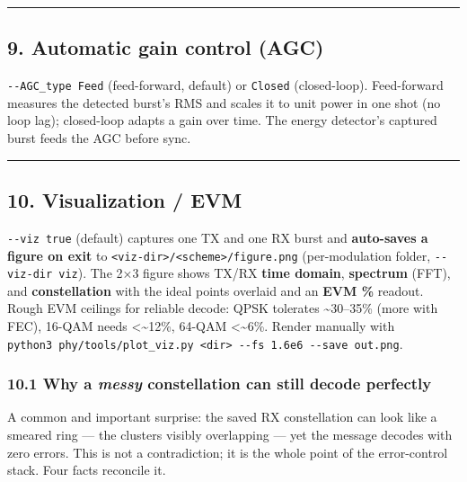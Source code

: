\documentclass[
  10pt,
]{article}
\begin{document}
\begin{center}\rule{0.5\linewidth}{0.5pt}\end{center}

\hypertarget{9-automatic-gain-control-agc}{%
\subsection{9. Automatic gain control
(AGC)}\label{9-automatic-gain-control-agc}}

\texttt{-\/-AGC\_type\ Feed} (feed-forward, default) or \texttt{Closed}
(closed-loop). Feed-forward measures the detected burst's RMS and scales
it to unit power in one shot (no loop lag); closed-loop adapts a gain
over time. The energy detector's captured burst feeds the AGC before
sync.

\begin{center}\rule{0.5\linewidth}{0.5pt}\end{center}

\hypertarget{10-visualization--evm}{%
\subsection{10. Visualization / EVM}\label{10-visualization--evm}}

\texttt{-\/-viz\ true} (default) captures one TX and one RX burst and
\textbf{auto-saves a figure on exit} to
\texttt{\textless{}viz-dir\textgreater{}/\textless{}scheme\textgreater{}/figure.png}
(per-modulation folder, \texttt{-\/-viz-dir\ viz}). The 2×3 figure shows
TX/RX \textbf{time domain}, \textbf{spectrum} (FFT), and
\textbf{constellation} with the ideal points overlaid and an \textbf{EVM
\%} readout. Rough EVM ceilings for reliable decode: QPSK tolerates
\textasciitilde30--35\% (more with FEC), 16-QAM needs
\textless\textasciitilde12\%, 64-QAM \textless\textasciitilde6\%. Render
manually with
\texttt{python3\ phy/tools/plot\_viz.py\ \textless{}dir\textgreater{}\ -\/-fs\ 1.6e6\ -\/-save\ out.png}.

\hypertarget{101-why-a-messy-constellation-can-still-decode-perfectly}{%
\subsubsection{\texorpdfstring{10.1 Why a \emph{messy} constellation can
still decode
perfectly}{10.1 Why a messy constellation can still decode perfectly}}\label{101-why-a-messy-constellation-can-still-decode-perfectly}}

A common and important surprise: the saved RX constellation can look
like a smeared ring --- the clusters visibly overlapping --- yet the
message decodes with zero errors. This is not a contradiction; it is the
whole point of the error-control stack. Four facts reconcile it.
\end{document}
